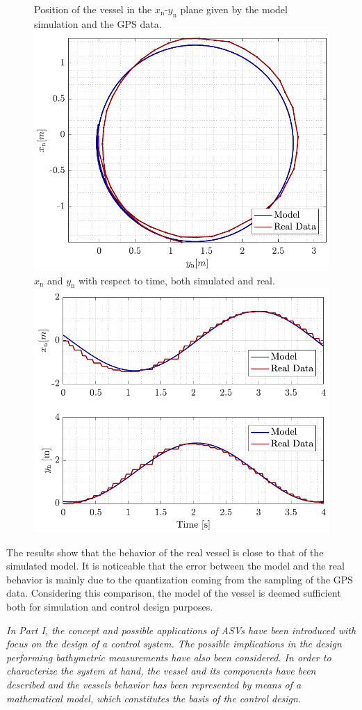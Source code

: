 \begin{figure}[H]
    \captionbox 
    {   
        Position of the vessel in the $x_\mathrm{n}$-$y_\mathrm{n}$ plane given by the model simulation and the GPS data.
        \label{fig:turn}
    }                                                                 
    {                                                                  
        \includegraphics[width=.45\textwidth]{figures/turn}         
    }                                                                    
    \hspace{5pt}                                                          
    \captionbox  
    {      
        $x_\mathrm{n}$ and $y_\mathrm{n}$ with respect to time, both simulated and real.
        \label{fig:turn_time}
    }                                                                        
    {
        \includegraphics[width=.45\textwidth]{figures/turn_time}
    }
\end{figure}

The results show that the behavior of the real vessel is close to that of the simulated model. It is noticeable that the error between the model and the real behavior is mainly due to the quantization coming from the sampling of the GPS data. Considering this comparison, the model of the vessel is deemed sufficient both for simulation and control design purposes. 

{\vspace*{\fill}
\textit{In Part I, the concept and possible applications of ASVs have been introduced with focus on the design of a control system. The possible implications in the design  performing bathymetric measurements have also been considered. In order to characterize the system at hand, the vessel and its components have been described and the vessels behavior has been represented by means of a mathematical model, which constitutes the basis of the control design.}}


